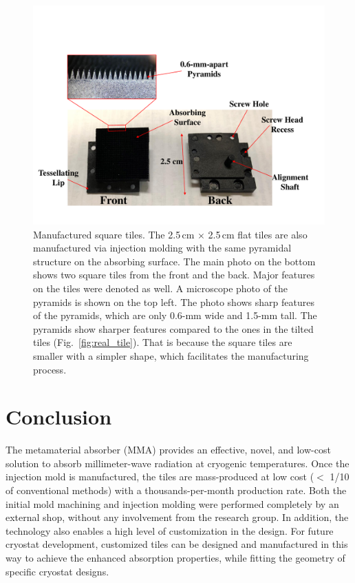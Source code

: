 \begin{figure}[t]
    \centering
    \includegraphics[width=\textwidth]{Figures/square_tiles.pdf}
    \caption{Manufactured square tiles. The 2.5\,cm $\times$ 2.5\,cm flat tiles are also manufactured via injection molding with the same pyramidal structure on the absorbing surface. The main photo on the bottom shows two square tiles from the front and the back. Major features on the tiles were denoted as well. A microscope photo of the pyramids is shown on the top left. The photo shows sharp features of the pyramids, which are only 0.6-mm wide and 1.5-mm tall. The pyramids show sharper features compared to the ones in the tilted tiles (Fig.~\ref{fig:real_tile}). That is because the square tiles are smaller with a simpler shape, which facilitates the manufacturing process.}
    \label{fig:square_tiles}
\end{figure}
\section{Conclusion}
\label{sec:conclusion}

The metamaterial absorber (MMA) provides an effective, novel, and low-cost solution to absorb millimeter-wave radiation at cryogenic temperatures. Once the injection mold is manufactured, the tiles are mass-produced at low cost ($<$ 1/10 of conventional methods) with a thousands-per-month production rate. Both the initial mold machining and injection molding were performed completely by an external shop, without any involvement from the research group. In addition, the technology also enables a high level of customization in the design. For future cryostat development, customized tiles can be designed and manufactured in this way to achieve the enhanced absorption properties, while fitting the geometry of specific cryostat designs.



